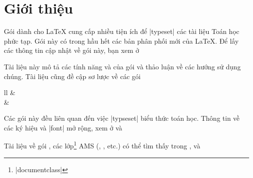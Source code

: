 \chapter{Giới thiệu}

Gói  dành cho \LaTeX{} cung cấp nhiều tiện ích để |typeset|
các tài liệu Toán học phức tạp. Gói này có trong hầu hết các bản phân phối
mới của \LaTeX{}. Để lấy các thông tin cập nhật về gói này, bạn xem ở

\medskip
{}
\medskip

Tài liệu này mô tả các tính năng và của gói  và thảo luận
về các hướng sử dụng chúng. Tài liệu cũng đề cập sơ lược về các gói
\begin{ctab}{ll}
& \\
& \\
\end{ctab}
Các gói này đều liên quan đến việc |typseset| biểu thức toán học.
Thông tin về các ký hiệu và |font| mở rộng, xem ở \cite{amsfonts} và

\medskip
{}
\medskip
\noindent
Tài liệu về gói , các lớp\footnote{|documentclass|} AMS (,
, etc.\@) có thể tìm thấy trong \cite{amsthdoc}, \cite{instr-l}
và 

